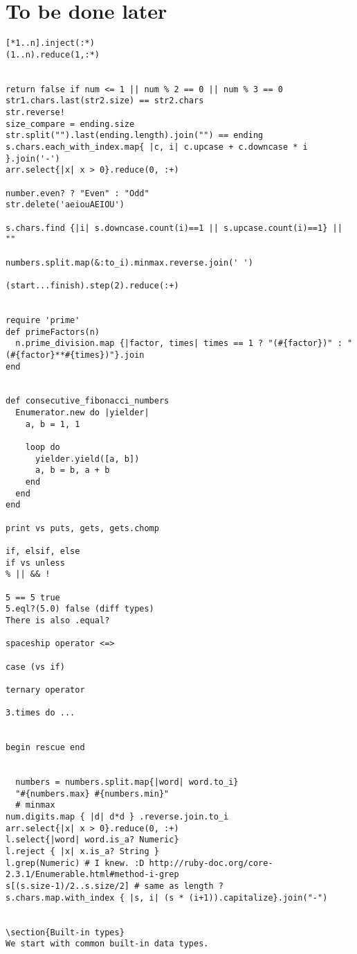 \documentclass{a5charun}
\begin{document}
\section{To be done later}
\begin{verbatim}
[*1..n].inject(:*)
(1..n).reduce(1,:*)


return false if num <= 1 || num % 2 == 0 || num % 3 == 0 
str1.chars.last(str2.size) == str2.chars
str.reverse!
size_compare = ending.size
str.split("").last(ending.length).join("") == ending
s.chars.each_with_index.map{ |c, i| c.upcase + c.downcase * i }.join('-')
arr.select{|x| x > 0}.reduce(0, :+)

number.even? ? "Even" : "Odd"
str.delete('aeiouAEIOU')

s.chars.find {|i| s.downcase.count(i)==1 || s.upcase.count(i)==1} || ""

numbers.split.map(&:to_i).minmax.reverse.join(' ')

(start...finish).step(2).reduce(:+)


require 'prime'
def primeFactors(n)
  n.prime_division.map {|factor, times| times == 1 ? "(#{factor})" : "(#{factor}**#{times})"}.join
end


def consecutive_fibonacci_numbers
  Enumerator.new do |yielder|
    a, b = 1, 1
    
    loop do
      yielder.yield([a, b])
      a, b = b, a + b
    end
  end
end

print vs puts, gets, gets.chomp

if, elsif, else
if vs unless
% || && ! 

5 == 5 true
5.eql?(5.0) false (diff types)
There is also .equal?

spaceship operator <=>

case (vs if)

ternary operator

3.times do ...


begin rescue end


  numbers = numbers.split.map{|word| word.to_i}
  "#{numbers.max} #{numbers.min}"
  # minmax
num.digits.map { |d| d*d } .reverse.join.to_i
arr.select{|x| x > 0}.reduce(0, :+)
l.select{|word| word.is_a? Numeric}
l.reject { |x| x.is_a? String }
l.grep(Numeric) # I knew. :D http://ruby-doc.org/core-2.3.1/Enumerable.html#method-i-grep
s[(s.size-1)/2..s.size/2] # same as length ?
s.chars.map.with_index { |s, i| (s * (i+1)).capitalize}.join("-")


\section{Built-in types}
We start with common built-in data types.


\end{verbatim}
\end{document}
